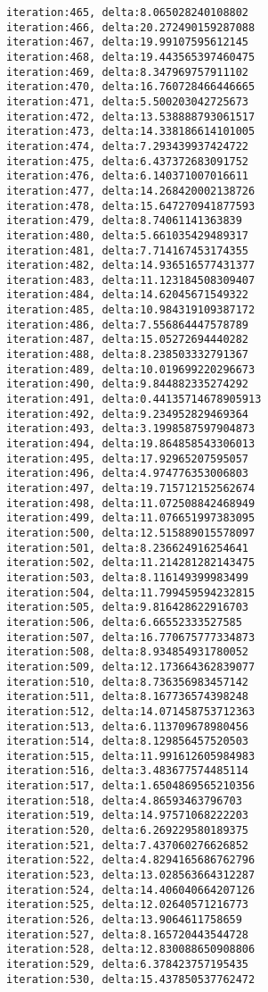 \documentclass[11pt]{article}
\begin{document}
\begin{Verbatim}[commandchars=\\\{\}]
iteration:465, delta:8.065028240108802
iteration:466, delta:20.272490159287088
iteration:467, delta:19.99107595612145
iteration:468, delta:19.443565397460475
iteration:469, delta:8.347969757911102
iteration:470, delta:16.760728466446665
iteration:471, delta:5.500203042725673
iteration:472, delta:13.538888793061517
iteration:473, delta:14.338186614101005
iteration:474, delta:7.293439937424722
iteration:475, delta:6.437372683091752
iteration:476, delta:6.140371007016611
iteration:477, delta:14.268420002138726
iteration:478, delta:15.647270941877593
iteration:479, delta:8.74061141363839
iteration:480, delta:5.661035429489317
iteration:481, delta:7.714167453174355
iteration:482, delta:14.936516577431377
iteration:483, delta:11.123184508309407
iteration:484, delta:14.62045671549322
iteration:485, delta:10.984319109387172
iteration:486, delta:7.556864447578789
iteration:487, delta:15.05272694440282
iteration:488, delta:8.238503332791367
iteration:489, delta:10.019699220296673
iteration:490, delta:9.844882335274292
iteration:491, delta:0.44135714678905913
iteration:492, delta:9.234952829469364
iteration:493, delta:3.1998587597904873
iteration:494, delta:19.864858543306013
iteration:495, delta:17.92965207595057
iteration:496, delta:4.974776353006803
iteration:497, delta:19.715712152562674
iteration:498, delta:11.072508842468949
iteration:499, delta:11.076651997383095
iteration:500, delta:12.515889015578097
iteration:501, delta:8.236624916254641
iteration:502, delta:11.214281282143475
iteration:503, delta:8.116149399983499
iteration:504, delta:11.799459594232815
iteration:505, delta:9.816428622916703
iteration:506, delta:6.66552333527585
iteration:507, delta:16.770675777334873
iteration:508, delta:8.934854931780052
iteration:509, delta:12.173664362839077
iteration:510, delta:8.736356983457142
iteration:511, delta:8.167736574398248
iteration:512, delta:14.071458753712363
iteration:513, delta:6.113709678980456
iteration:514, delta:8.129856457520503
iteration:515, delta:11.991612605984983
iteration:516, delta:3.483677574485114
iteration:517, delta:1.6504869565210356
iteration:518, delta:4.86593463796703
iteration:519, delta:14.97571068222203
iteration:520, delta:6.269229580189375
iteration:521, delta:7.437060276626852
iteration:522, delta:4.8294165686762796
iteration:523, delta:13.028563664312287
iteration:524, delta:14.406040664207126
iteration:525, delta:12.02640571216773
iteration:526, delta:13.9064611758659
iteration:527, delta:8.165720443544728
iteration:528, delta:12.830088650908806
iteration:529, delta:6.378423757195435
iteration:530, delta:15.437850537762472

\end{Verbatim}
\end{document}
